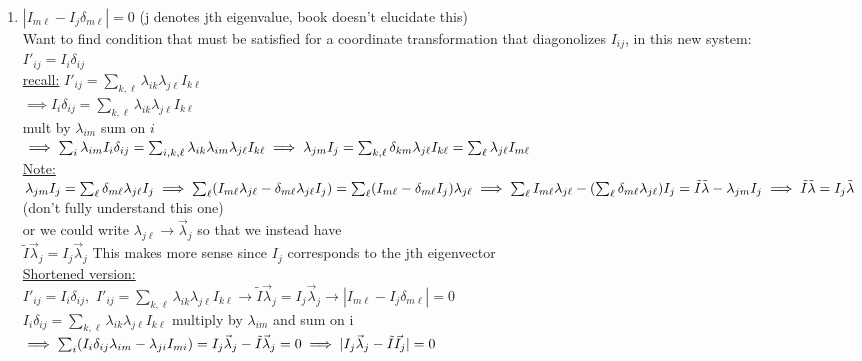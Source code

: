 \documentclass[12pt]{amsart}
\begin{document}
\begin{enumerate}
\hdashrule[0.5ex][c]{\linewidth}{0.5pt}{1.5mm}


\item \underline{$| I_{m \ell} - I_j \delta_{m \ell} |=0$} (j denotes jth eigenvalue, book doesn't elucidate this)\\
Want to find condition that must be satisfied for a coordinate transformation that diagonolizes $I_{ij}$, in this new system:\\
$I'_{ij}=I_i \delta_{ij}$\\
\underline{recall:}  $I'_{ij}=\sum_{k, \ell} \lambda_{ik} \lambda_{j \ell} I_{k \ell}$\\
$\implies I_i \delta_{ij}=\sum_{k, \ell} \lambda_{ik} \lambda_{j \ell} I_{k \ell}$\\
mult by $\lambda_{im}$ sum on $i$\\
$\implies \sum_i \lambda_{im} I_i \delta_{ij}=\sum_{i,k,\ell} \lambda_{ik} \lambda_{im} \lambda_{j \ell} I_{k \ell}\\
\implies \lambda_{jm} I_j = \sum _{k, \ell} \delta_{km} \lambda_{j \ell} I_{k\ell} = \sum_{\ell} \lambda_{j \ell} I_{m \ell}$\\
\underline{Note:}$ \lambda_{jm} I_j= \sum_{\ell} \delta_{m \ell} \lambda_{j \ell} I_j\\
\implies \sum_{\ell}( I_{m \ell} \lambda_{j \ell} - \delta_{m \ell} \lambda_{j \ell} I_j)= \sum_{\ell} ( I_{m \ell} - \delta_{m \ell} I_j) \lambda_{j \ell}\\
\implies \sum_{\ell} I_{m \ell} \lambda_{j \ell} - (\sum_{\ell} \delta_{m \ell} \lambda_{j \ell}) I_j= \tilde{I} \tilde{\lambda}-\lambda_{jm} I_j\\
\implies \tilde{I} \tilde{\lambda}=I_j \tilde{\lambda}$ (don't fully understand this one)\\
or we could write $\lambda_{j \ell} \rightarrow \vec{\lambda}_j$ so that we instead have\\
$\tilde{I} \vec{\lambda}_j = I_j \vec{\lambda}_j$ 
This makes more sense since $I_j$ corresponds to the jth eigenvector\\
\underline{Shortened version:}\\  $I'_{ij} = I_i \delta_{ij},\,\, I'_{ij}=\sum_{k, \ell} \lambda_{ik} \lambda_{j \ell} I_{k \ell} \rightarrow \tilde{I} \vec{\lambda}_j = I_j \vec{\lambda}_j \rightarrow |I_{m \ell} - I_j \delta_{m \ell}| = 0$\\
$I_i \delta_{ij}=\sum_{k, \ell} \lambda_{ik} \lambda_{j \ell} I_{k \ell}$ multiply by $\lambda_{im}$ and sum on i \\
$\implies \sum_i(I_i \delta_{ij} \lambda_{im} - \lambda_{ji} I_{mi})= I_j \vec{\lambda}_j - \tilde{I} \vec{\lambda}_j=0\\
\implies |I_j \vec{\lambda}_j - \tilde{I} \vec{I}_j|=0$



\end{enumerate}
\end{document}

